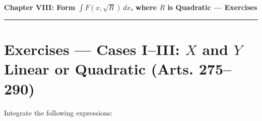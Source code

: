 \documentclass[11pt, a4paper]{article}
\begin{document}
\newpage

\begin{center}
    {\LARGE \bfseries \color{accent} Chapter VIII: Form $\displaystyle\int F(x,\sqrt{R})\,dx$, where $R$ is Quadratic --- Exercises}\\
    \vspace{0.2cm}
    {\color{accent}\rule{0.55\linewidth}{0.8pt}}
\end{center}
\vspace{0.35cm}

\section*{Exercises --- Cases I--III: $X$ and $Y$ Linear or Quadratic (Arts. 275--290)}

Integrate the following expressions:
\end{document}
